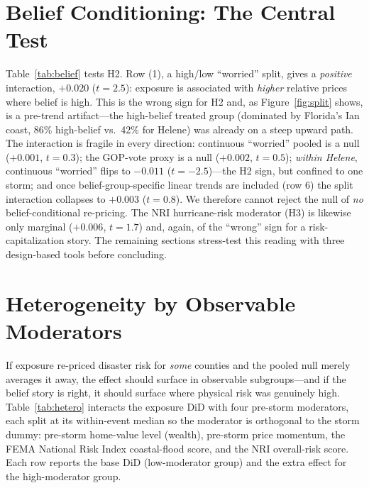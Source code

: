 \documentclass[12pt]{article}
\begin{document}
\section{Belief Conditioning: The Central Test}\label{sec:belief}
Table~\ref{tab:belief} tests H2. Row (1), a high/low ``worried'' split, gives a
\emph{positive} interaction, $+0.020$ ($t=2.5$): exposure is associated with \emph{higher}
relative prices where belief is high. This is the wrong sign for H2 and, as Figure~\ref{fig:split}
shows, is a pre-trend artifact---the high-belief treated group (dominated by Florida's Ian
coast, 86\% high-belief vs.\ 42\% for Helene) was already on a steep upward path. The
interaction is fragile in every direction: continuous ``worried'' pooled is a null
($+0.001$, $t=0.3$); the GOP-vote proxy is a null ($+0.002$, $t=0.5$); \emph{within Helene},
continuous ``worried'' flips to $-0.011$ ($t=-2.5$)---the H2 sign, but confined to one storm;
and once belief-group-specific linear trends are included (row 6) the split interaction
collapses to $+0.003$ ($t=0.8$). We therefore cannot reject the null of \emph{no}
belief-conditional re-pricing. The NRI hurricane-risk moderator (H3) is likewise only
marginal ($+0.006$, $t=1.7$) and, again, of the ``wrong'' sign for a risk-capitalization
story. The remaining sections stress-test this reading with three design-based tools before
concluding.

\section{Heterogeneity by Observable Moderators}\label{sec:het}
If exposure re-priced disaster risk for \emph{some} counties and the pooled null merely
averages it away, the effect should surface in observable subgroups---and if the belief story is
right, it should surface where physical risk was genuinely high. Table~\ref{tab:hetero}
interacts the exposure DiD with four pre-storm moderators, each split at its within-event median
so the moderator is orthogonal to the storm dummy: pre-storm home-value level (wealth), pre-storm
price momentum, the FEMA National Risk Index coastal-flood score, and the NRI overall-risk score.
Each row reports the base DiD (low-moderator group) and the extra effect for the high-moderator
group.
\end{document}
